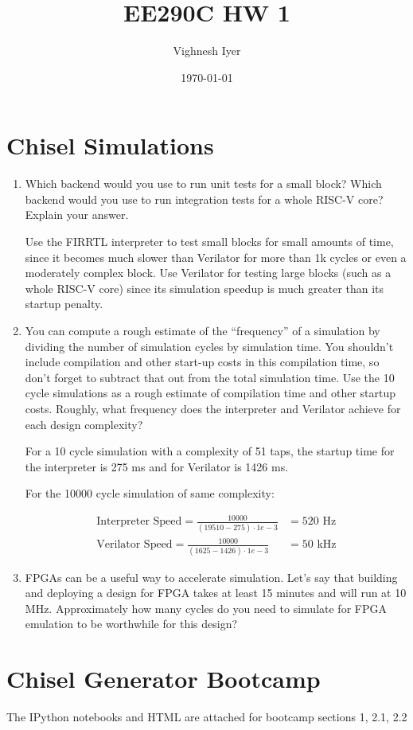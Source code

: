 

\newcommand{\headertext}{EE290C HW 1}
\renewcommand{\thesubsection}{\thesection.\alph{subsection}}

\title{\vspace{-0.4in}\Large \bf \headertext \vspace{-0.1in}}
\author{Vighnesh Iyer}

\date{\today}
\maketitle

\markboth{\headertext}{\headertext}
\thispagestyle{empty}

\section{Chisel Simulations}
\begin{enumerate}
    \item {\color{blue} Which backend would you use to run unit tests for a small block? Which backend would you use to run integration tests for a whole RISC-V core? Explain your answer.}

        Use the FIRRTL interpreter to test small blocks for small amounts of time, since it becomes much slower than Verilator for more than 1k cycles or even a moderately complex block. Use Verilator for testing large blocks (such as a whole RISC-V core) since its simulation speedup is much greater than its startup penalty.

    \item {\color{blue} You can compute a rough estimate of the “frequency” of a simulation by dividing the number of simulation cycles by simulation time. You shouldn’t include compilation and other start-up costs in this compilation time, so don’t forget to subtract that out from the total simulation time. Use the 10 cycle simulations as a rough estimate of compilation time and other startup costs. Roughly, what frequency does the interpreter and Verilator achieve for each design complexity?}

    For a 10 cycle simulation with a complexity of 51 taps, the startup time for the interpreter is 275 ms and for Verilator is 1426 ms.

    For the 10000 cycle simulation of same complexity:

    \begin{align}
        \text{Interpreter Speed} = \frac{10000}{(19510 - 275) \cdot 1e-3} &= 520 \text{ Hz} \nonumber \\
        \text{Verilator Speed} = \frac{10000}{(1625 - 1426) \cdot 1e-3} &= 50 \text{ kHz} \nonumber
    \end{align}

    \item {\color{blue} FPGAs can be a useful way to accelerate simulation. Let’s say that building and deploying a design for FPGA takes at least 15 minutes and will run at 10 MHz. Approximately how many cycles do you need to simulate for FPGA emulation to be worthwhile for this design?}
\end{enumerate}

\section{Chisel Generator Bootcamp}
The IPython notebooks and HTML are attached for bootcamp sections 1, 2.1, 2.2


